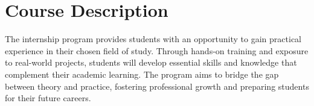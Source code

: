 
\section*{Course Description}



\bigskip
The internship program provides students with an opportunity to gain practical experience in their chosen field of study. Through hands-on training and exposure to real-world projects, students will develop essential skills and knowledge that complement their academic learning. The program aims to bridge the gap between theory and practice, fostering professional growth and preparing students for their future careers.

